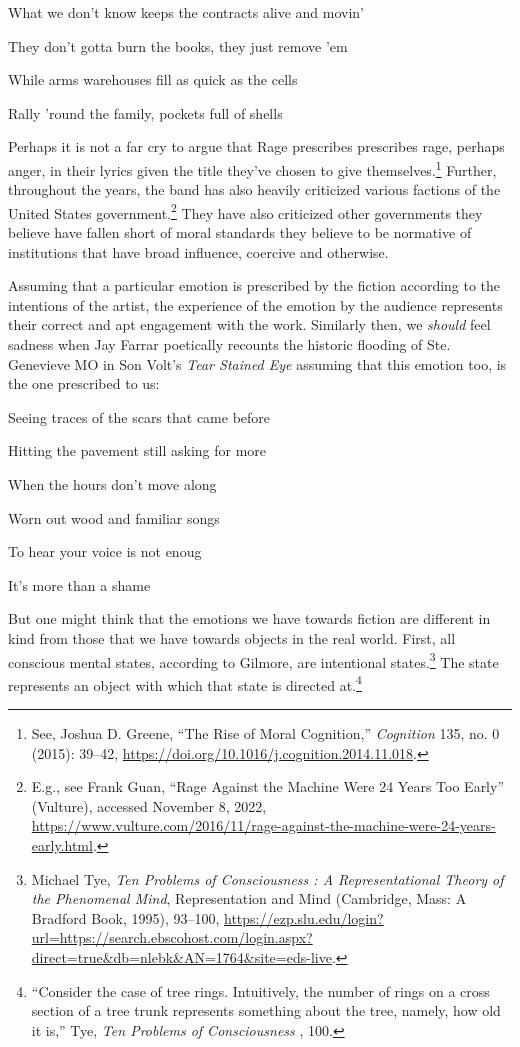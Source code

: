 \documentclass[
  12pt,
]{book}
\theoremstyle{definition}
\theoremstyle{definition}
\theoremstyle{definition}
\theoremstyle{definition}
\theoremstyle{remark}
\begin{document}
What we don't know keeps the contracts alive and movin'

They don't gotta burn the books, they just remove 'em

While arms warehouses fill as quick as the cells

Rally 'round the family, pockets full of shells

\noindent Perhaps it is not a far cry to argue that Rage prescribes prescribes rage, perhaps anger, in their lyrics given the title they've chosen to give themselves.\footnote{See, Joshua D. Greene, {``The Rise of Moral Cognition,''} \emph{Cognition} 135, no. 0 (2015): 39--42, \url{https://doi.org/10.1016/j.cognition.2014.11.018}.} Further, throughout the years, the band has also heavily criticized various factions of the United States government.\footnote{E.g., see Frank Guan, {``Rage Against the Machine Were 24 Years Too Early''} (Vulture), accessed November 8, 2022, \url{https://www.vulture.com/2016/11/rage-against-the-machine-were-24-years-early.html}.} They have also criticized other governments they believe have fallen short of moral standards they believe to be normative of institutions that have broad influence, coercive and otherwise.

Assuming that a particular emotion is prescribed by the fiction according to the intentions of the artist, the experience of the emotion by the audience represents their correct and apt engagement with the work. Similarly then, we \emph{should} feel sadness when Jay Farrar poetically recounts the historic flooding of Ste. Genevieve MO in Son Volt's \emph{Tear Stained Eye} assuming that this emotion too, is the one prescribed to us:

Seeing traces of the scars that came before

Hitting the pavement still asking for more

When the hours don't move along

Worn out wood and familiar songs

To hear your voice is not enoug

It's more than a shame

But one might think that the emotions we have towards fiction are different in kind from those that we have towards objects in the real world. First, all conscious mental states, according to Gilmore, are intentional states.\footnote{Michael Tye, \emph{Ten {Problems} of {Consciousness} : {A Representational Theory} of the {Phenomenal Mind}}, Representation and {Mind} (Cambridge, Mass: A Bradford Book, 1995), 93--100, \url{https://ezp.slu.edu/login?url=https://search.ebscohost.com/login.aspx?direct=true&db=nlebk&AN=1764&site=eds-live}.} The state represents an object with which that state is directed at.\footnote{``Consider the case of tree rings. Intuitively, the number of rings on a cross section of a tree trunk represents something about the tree, namely, how old it is,'' Tye, \emph{Ten {Problems} of {Consciousness} }, 100.}
\end{document}
